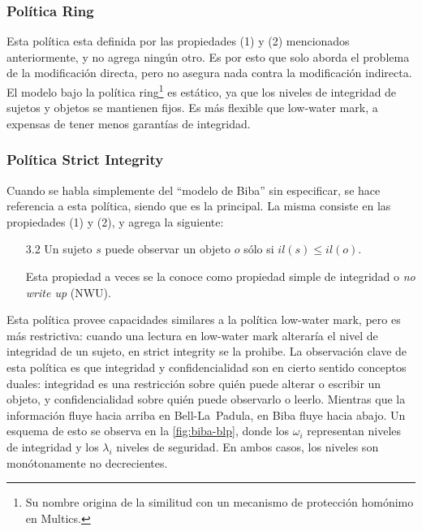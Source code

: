 \documentclass[spanish]{article}
\theoremstyle{definition}
\begin{document}
\subsubsection{Política Ring}
Esta política esta definida por las propiedades (1) y (2) mencionados
anteriormente, y no agrega ningún otro. Es por esto que solo aborda el problema
de la modificación directa, pero no asegura nada contra la modificación
indirecta. El modelo bajo la política ring\footnote{Su nombre origina de la
similitud con un mecanismo de protección homónimo en Multics.} es estático, ya
que los niveles de integridad de sujetos y objetos se mantienen fijos. Es más
flexible que low-water mark, a expensas de tener menos garantías de integridad.

\subsubsection{Política Strict Integrity}

Cuando se habla simplemente del ``modelo de Biba'' sin especificar, se hace
referencia a esta política, siendo que es la principal. La misma consiste en las
propiedades (1) y (2), y agrega la siguiente:
\begin{itemize}
  \item[3.2] Un sujeto $s$ puede observar un objeto $o$ sólo si $il(s) \leq il(o)$.

    Esta propiedad a veces se la conoce como propiedad simple de integridad o
    \textit{no write up} (NWU).
  \end{itemize}
Esta política provee capacidades similares a la política low-water mark, pero es
más restrictiva: cuando una lectura en low-water mark alteraría el nivel de
integridad de un sujeto, en strict integrity se la prohibe. La observación clave
de esta política es que integridad y confidencialidad son en cierto sentido
conceptos duales: integridad es una restricción sobre quién puede alterar o
escribir un objeto, y confidencialidad sobre quién puede observarlo o leerlo.
Mientras que la información fluye hacia arriba en Bell-La~Padula, en Biba fluye
hacia abajo. Un esquema de esto se observa en la \autoref{fig:biba-blp}, donde
los $\omega_i$ representan niveles de integridad y los $\lambda_i$ niveles de
seguridad. En ambos casos, los niveles son monótonamente no decrecientes.
\end{document}
